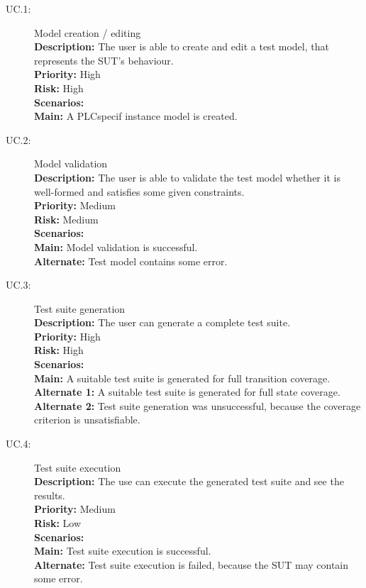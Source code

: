 \begin{description}
	\item[UC.1:] Model creation / editing\\
		\textbf{Description:} The user is able to create and edit a test model, that represents the SUT's behaviour.\\
		\textbf{Priority:} High\\
		\textbf{Risk:} High\\
		\textbf{Scenarios:}\\
			\-\hspace{0,5cm}\textbf{Main:} A PLCspecif instance model is created.
	\item[UC.2:] Model validation\\
		\textbf{Description:} The user is able to validate the test model whether it is well-formed and satisfies some given constraints.\\
		\textbf{Priority:} Medium\\
		\textbf{Risk:} Medium\\
		\textbf{Scenarios:}\\
			\-\hspace{0,5cm}\textbf{Main:} Model validation is successful.\\
			\-\hspace{0,5cm}\textbf{Alternate:} Test model contains some error.
	\item[UC.3:] Test suite generation\\
		\textbf{Description:} The user can generate a complete test suite.\\
		\textbf{Priority:} High\\
		\textbf{Risk:} High\\
		\textbf{Scenarios:}\\
			\-\hspace{0,5cm}\textbf{Main:} A suitable test suite is generated for full transition coverage.\\
			\-\hspace{0,5cm}\textbf{Alternate 1:} A suitable test suite is generated for full state coverage.\\
			\-\hspace{0,5cm}\textbf{Alternate 2:} Test suite generation was unsuccessful, because the coverage criterion is unsatisfiable.
	\item[UC.4:] Test suite execution\\
		\textbf{Description:} The use can execute the generated test suite and see the results.\\
		\textbf{Priority:} Medium\\
		\textbf{Risk:} Low\\
		\textbf{Scenarios:}\\
			\-\hspace{0,5cm}\textbf{Main:} Test suite execution is successful.\\
			\-\hspace{0,5cm}\textbf{Alternate:} Test suite execution is failed, because the SUT may contain some error.
\end{description}

